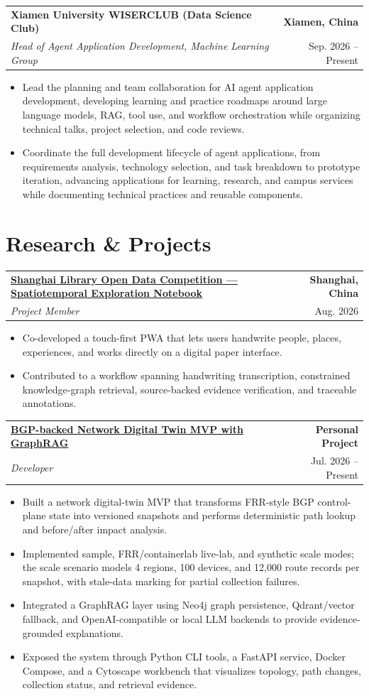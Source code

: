 \documentclass[letterpaper,10pt]{article}
\makeatletter
\newcommand{\resumeProject}[4]{
    \vspace{2pt}
    \noindent
    \begin{tabularx}{\textwidth}{@{}X@{\hspace{1em}}r@{}}
        \textbf{#1} & \textbf{#2} \\
        \textit{\textcolor{textgray}{#3}} & \textcolor{textgray}{#4} \\
    \end{tabularx}
    \vspace{-4pt}
}
\makeatother
\begin{document}
\resumeProject
{Xiamen University WISERCLUB (Data Science Club)}
{Xiamen, China}
{Head of Agent Application Development, Machine Learning Group}
{Sep. 2026 -- Present}
\begin{itemize}
  \item Lead the planning and team collaboration for AI agent application development, developing learning and practice roadmaps around large language models, RAG, tool use, and workflow orchestration while organizing technical talks, project selection, and code reviews.
  \item Coordinate the full development lifecycle of agent applications, from requirements analysis, technology selection, and task breakdown to prototype iteration, advancing applications for learning, research, and campus services while documenting technical practices and reusable components.
\end{itemize}

\section{Research \& Projects}

\resumeProject
{\href{https://github.com/Romanrose/shangtu-notebook}{Shanghai Library Open Data Competition --- Spatiotemporal Exploration Notebook}}
{Shanghai, China}
{Project Member}
{Aug. 2026}
\begin{itemize}
  \item Co-developed a touch-first PWA that lets users handwrite people, places, experiences, and works directly on a digital paper interface.
  \item Contributed to a workflow spanning handwriting transcription, constrained knowledge-graph retrieval, source-backed evidence verification, and traceable annotations.
\end{itemize}

\resumeProject
{\href{https://github.com/VincentXing23/Graphrag-for-Network/tree/main}{BGP-backed Network Digital Twin MVP with GraphRAG}}
{Personal Project}
{Developer}
{Jul. 2026 -- Present}
\begin{itemize}
  \item Built a network digital-twin MVP that transforms FRR-style BGP control-plane state into versioned snapshots and performs deterministic path lookup and before/after impact analysis.
  \item Implemented sample, FRR/containerlab live-lab, and synthetic scale modes; the scale scenario models 4 regions, 100 devices, and 12,000 route records per snapshot, with stale-data marking for partial collection failures.
  \item Integrated a GraphRAG layer using Neo4j graph persistence, Qdrant/vector fallback, and OpenAI-compatible or local LLM backends to provide evidence-grounded explanations.
  \item Exposed the system through Python CLI tools, a FastAPI service, Docker Compose, and a Cytoscape workbench that visualizes topology, path changes, collection status, and retrieval evidence.
\end{itemize}
\end{document}
